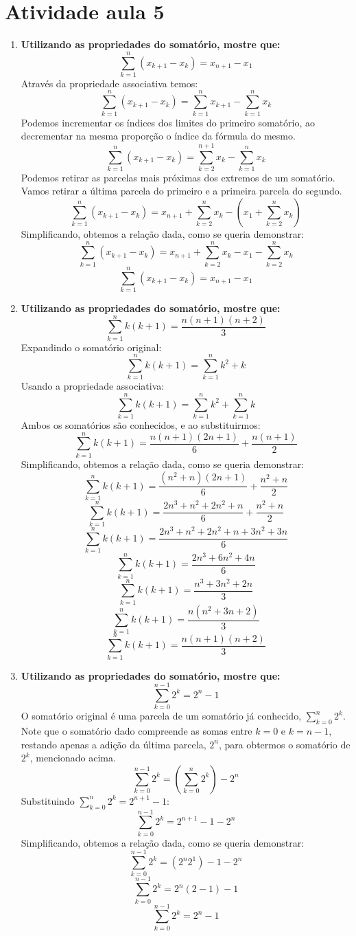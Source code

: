 \section*{Atividade aula 5}

\begin{enumerate}
	\item \textbf{Utilizando as propriedades do somatório, mostre que:}
	$$\sum_{k=1}^{n}(x_{k+1}-x_k) = x_{n+1}-x_1$$
	Através da propriedade associativa temos:
	$$\sum_{k=1}^{n}(x_{k+1}-x_k) = \sum_{k=1}^{n}x_{k+1} - \sum_{k=1}^{n}x_k$$
	Podemos incrementar os índices dos limites do primeiro somatório, ao decrementar na mesma proporção o índice da fórmula do mesmo.
	$$\sum_{k=1}^{n}(x_{k+1}-x_k) = \sum_{k=2}^{n+1}x_{k} - \sum_{k=1}^{n}x_k$$
	Podemos retirar as parcelas mais próximas dos extremos de um somatório. Vamos retirar a última parcela do primeiro e a primeira parcela do segundo.
	$$\sum_{k=1}^{n}(x_{k+1}-x_k) = x_{n+1}+\sum_{k=2}^{n}x_{k} - \left(x_1+\sum_{k=2}^{n}x_k\right)$$
	Simplificando, obtemos a relação dada, como se queria demonstrar:
	$$\sum_{k=1}^{n}(x_{k+1}-x_k) = x_{n+1}+\sum_{k=2}^{n}x_{k} - x_1-\sum_{k=2}^{n}x_k$$
	$$\sum_{k=1}^{n}(x_{k+1}-x_k) = x_{n+1} - x_1$$

	\item \textbf{Utilizando as propriedades do somatório, mostre que:}
	$$\sum_{k=1}^{n}k(k+1) = \frac{n(n+1)(n+2)}{3}$$
	Expandindo o somatório original:
	$$\sum_{k=1}^{n}k(k+1) = \sum_{k=1}^{n}k^2 + k$$
	Usando a propriedade associativa:
	$$\sum_{k=1}^{n}k(k+1) = \sum_{k=1}^{n}k^2 + \sum_{k=1}^{n}k$$
	Ambos os somatórios são conhecidos, e ao substituirmos:
	$$\sum_{k=1}^{n}k(k+1) = \frac{n(n+1)(2n+1)}{6} + \frac{n(n+1)}{2}$$
	Simplificando, obtemos a relação dada, como se queria demonstrar:
	$$\sum_{k=1}^{n}k(k+1) = \frac{(n^2+n)(2n+1)}{6} + \frac{n^2+n}{2}$$
	$$\sum_{k=1}^{n}k(k+1) = \frac{2n^3+n^2+2n^2+n}{6} + \frac{n^2+n}{2}$$
	$$\sum_{k=1}^{n}k(k+1) = \frac{2n^3+n^2+2n^2+n + 3n^2+3n}{6}$$
	$$\sum_{k=1}^{n}k(k+1) = \frac{2n^3+6n^2+4n}{6}$$
	$$\sum_{k=1}^{n}k(k+1) = \frac{n^3+3n^2+2n}{3}$$
	$$\sum_{k=1}^{n}k(k+1) = \frac{n(n^2+3n+2)}{3}$$
	$$\sum_{k=1}^{n}k(k+1) = \frac{n(n+1)(n+2)}{3}$$
	
	\item \textbf{Utilizando as propriedades do somatório, mostre que:}
	$$\sum_{k=0}^{n-1}2^k = 2^n-1$$
	O somatório original é uma parcela de um somatório já conhecido, $\sum_{k=0}^{n}2^k$. Note que o somatório dado compreende as somas entre $k=0$ e $k=n-1$, restando apenas a adição da última parcela, $2^n$, para obtermos o somatório de $2^k$, mencionado acima.
	$$\sum_{k=0}^{n-1}2^k = \left(\sum_{k=0}^{n}2^k\right) - 2^n$$
	Substituindo $\sum_{k=0}^{n}2^k = 2^{n+1}-1$:
	$$\sum_{k=0}^{n-1}2^k = 2^{n+1}-1 - 2^n$$
	Simplificando, obtemos a relação dada, como se queria demonstrar:
	$$\sum_{k=0}^{n-1}2^k = (2^{n}2^1)-1 - 2^n$$
	$$\sum_{k=0}^{n-1}2^k = 2^n(2-1)-1$$
	$$\sum_{k=0}^{n-1}2^k = 2^n-1$$
	

\end{enumerate}
